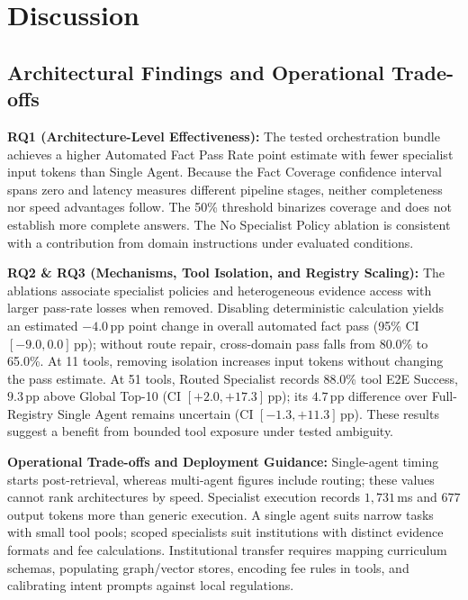 \section{Discussion}
\label{sec:discussion}

\subsection{Architectural Findings and Operational Trade-offs}

\textbf{RQ1 (Architecture-Level Effectiveness):}
The tested orchestration bundle achieves a higher Automated Fact Pass Rate point estimate with fewer specialist input tokens than Single Agent. Because the Fact Coverage confidence interval spans zero and latency measures different pipeline stages, neither completeness nor speed advantages follow. The 50\% threshold binarizes coverage and does not establish more complete answers. The No Specialist Policy ablation is consistent with a contribution from domain instructions under evaluated conditions.

\textbf{RQ2 \& RQ3 (Mechanisms, Tool Isolation, and Registry Scaling):}
The ablations associate specialist policies and heterogeneous evidence access with larger pass-rate losses when removed. Disabling deterministic calculation yields an estimated $-4.0$\,pp point change in overall automated fact pass (95\% CI $[-9.0, 0.0]$\,pp); without route repair, cross-domain pass falls from 80.0\% to 65.0\%. At 11 tools, removing isolation increases input tokens without changing the pass estimate. At 51 tools, Routed Specialist records 88.0\% tool E2E Success, $9.3$\,pp above Global Top-10 (CI $[+2.0, +17.3]$\,pp); its $4.7$\,pp difference over Full-Registry Single Agent remains uncertain (CI $[-1.3, +11.3]$\,pp). These results suggest a benefit from bounded tool exposure under tested ambiguity.

\textbf{Operational Trade-offs and Deployment Guidance:}
Single-agent timing starts post-retrieval, whereas multi-agent figures include routing; these values cannot rank architectures by speed. Specialist execution records $1{,}731$\,ms and $677$ output tokens more than generic execution. A single agent suits narrow tasks with small tool pools; scoped specialists suit institutions with distinct evidence formats and fee calculations. Institutional transfer requires mapping curriculum schemas, populating graph/vector stores, encoding fee rules in tools, and calibrating intent prompts against local regulations.

